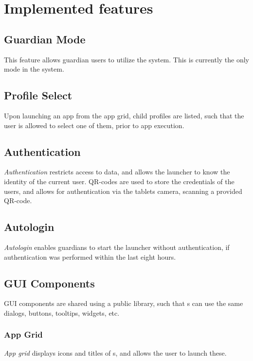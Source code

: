 \section{Implemented features}
\label{backlog_implemented}

\subsection{Guardian Mode}
\label{backlog:guardian_mode}
This feature allows guardian users to utilize the \giraf[] system. 
This is currently the only mode in the system.

%
\subsection{Profile Select}
\label{backlog:profile_select}
Upon launching an app from the app grid, child profiles are listed, such that the user is allowed to select one of them, prior to app execution.

%
\subsection{Authentication}
\label{backlog:authentication}
\emph{Authentication} restricts access to data, and allows the launcher to know the identity of the current user.
QR-codes are used to store the credentials of the users, and allows for authentication via the tablets camera, scanning a provided QR-code.

\subsection{Autologin}
\label{backlog:autologin}
\emph{Autologin} enables guardians to start the launcher without authentication, if authentication was performed within the last eight hours.

%
\subsection{GUI Components}
\label{backlog:GUI_components}
GUI components are shared using a public library, such that \girafapp[]s can use the same dialogs, buttons, tooltips, widgets, etc.

\subsubsection{App Grid}
\label{backlog:appgrid}
\emph{App grid} displays icons and titles of \girafapp[]s, and allows the user to launch these.

